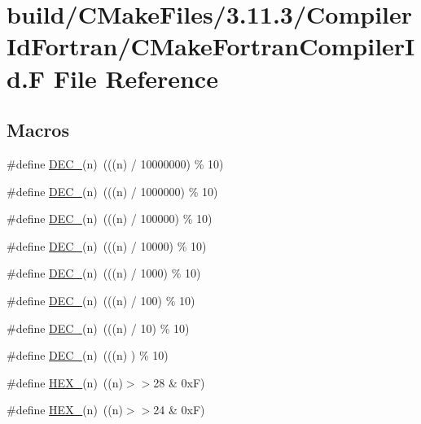 \hypertarget{_c_make_fortran_compiler_id_8_f}{}\section{build/\+C\+Make\+Files/3.11.3/\+Compiler\+Id\+Fortran/\+C\+Make\+Fortran\+Compiler\+Id.F File Reference}
\label{_c_make_fortran_compiler_id_8_f}
\subsection*{Macros}
\begin{DoxyCompactItemize}
\item 
\#define \mbox{\hyperlink{_c_make_fortran_compiler_id_8_f_ad96415719830014edf8e5fbf9ff5be90}{D\+E\+C\+\_}}(n)~(((n) / 10000000) \% 10)
\item 
\#define \mbox{\hyperlink{_c_make_fortran_compiler_id_8_f_a457408152b86d5cd99cbb0814821d90c}{D\+E\+C\+\_}}(n)~(((n) / 1000000)  \% 10)
\item 
\#define \mbox{\hyperlink{_c_make_fortran_compiler_id_8_f_afafc439095d3950ecda7a7b00aa82633}{D\+E\+C\+\_}}(n)~(((n) / 100000)   \% 10)
\item 
\#define \mbox{\hyperlink{_c_make_fortran_compiler_id_8_f_aabc9d40bbf2f7b07ff49d22155e9169b}{D\+E\+C\+\_}}(n)~(((n) / 10000)    \% 10)
\item 
\#define \mbox{\hyperlink{_c_make_fortran_compiler_id_8_f_a408a5b011d5d14bf3310165032e6c511}{D\+E\+C\+\_}}(n)~(((n) / 1000)     \% 10)
\item 
\#define \mbox{\hyperlink{_c_make_fortran_compiler_id_8_f_ae94836dfcd4db42e8e11da822e9393ad}{D\+E\+C\+\_}}(n)~(((n) / 100)      \% 10)
\item 
\#define \mbox{\hyperlink{_c_make_fortran_compiler_id_8_f_a0c9639be69eece9ad4ae1e75b9e8d85d}{D\+E\+C\+\_}}(n)~(((n) / 10)       \% 10)
\item 
\#define \mbox{\hyperlink{_c_make_fortran_compiler_id_8_f_ab98da40b1e10c35f4417d6344688b4b3}{D\+E\+C\+\_}}(n)~(((n)    )        \% 10)
\item 
\#define \mbox{\hyperlink{_c_make_fortran_compiler_id_8_f_ad2d1ded845d69acb0da180af795c100f}{H\+E\+X\+\_}}(n)~((n)$>$$>$28 \& 0x\+F)
\item 
\#define \mbox{\hyperlink{_c_make_fortran_compiler_id_8_f_a4f098fcff6d8a98093b6a36bbd374600}{H\+E\+X\+\_}}(n)~((n)$>$$>$24 \& 0x\+F)

\end{DoxyCompactItemize}

